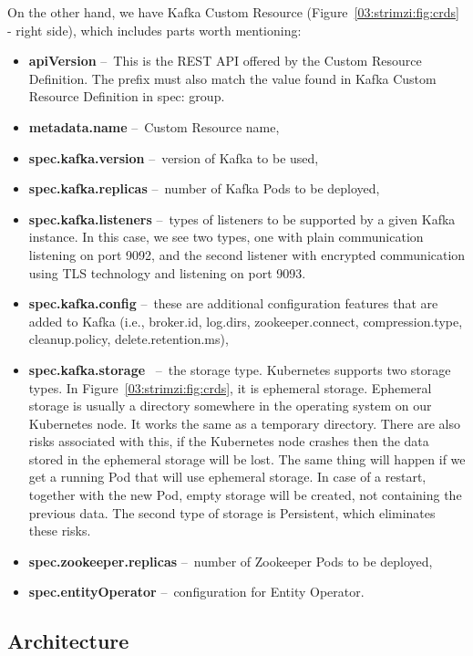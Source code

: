 On the other hand, we have Kafka Custom Resource (Figure~\ref{03:strimzi:fig:crds} - right side), which includes parts worth mentioning:
\begin{itemize}[itemsep=1mm, parsep=0pt]
  \item \textbf{apiVersion} \---\ This is the REST API offered by the Custom Resource Definition.
  The prefix must also match the value found in Kafka Custom Resource Definition in spec: group.
  \item \textbf{metadata.name} \---\ Custom Resource name,
  \item \textbf{spec.kafka.version} \---\ version of Kafka to be used,
  \item \textbf{spec.kafka.replicas} \---\ number of Kafka Pods to be deployed,
  \item \textbf{spec.kafka.listeners} \---\ types of listeners to be supported by a given Kafka instance.
  In this case, we see two types, one with plain communication listening on port 9092, and the second listener with encrypted communication using TLS technology and listening on port 9093.
  \item  \textbf{spec.kafka.config} \---\ these are additional configuration features that are added to Kafka (i.e., broker.id, log.dirs, zookeeper.connect, compression.type, cleanup.policy, delete.retention.ms),
  \item  \textbf{spec.kafka.storage}~\cite{strimziStorageBlogPost} \---\ the storage type.
  Kubernetes supports two storage types.
  In Figure~\ref{03:strimzi:fig:crds}, it is ephemeral storage.
  Ephemeral storage is usually a directory somewhere in the operating system on our Kubernetes node.
  It works the same as a temporary directory.
  There are also risks associated with this, if the Kubernetes node crashes then the data stored in the ephemeral storage will be lost.
  The same thing will happen if we get a running Pod that will use ephemeral storage.
  In case of a restart, together with the new Pod, empty storage will be created, not containing the previous data.
  The second type of storage is Persistent, which eliminates these risks.
  \item \textbf{spec.zookeeper.replicas} \---\ number of Zookeeper Pods to be deployed,
  \item \textbf{spec.entityOperator} \---\ configuration for Entity Operator.
\end{itemize}

\subsection{Architecture}

